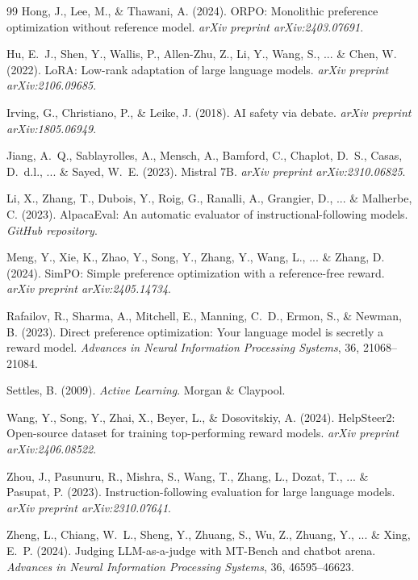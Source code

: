 \documentclass{article}
\begin{document}
\begin{thebibliography}{99}
Hong, J., Lee, M., \& Thawani, A. (2024).
ORPO: Monolithic preference optimization without reference model.
\textit{arXiv preprint arXiv:2403.07691}.

Hu, E.~J., Shen, Y., Wallis, P., Allen-Zhu, Z., Li, Y., Wang, S., ... \& Chen, W. (2022).
LoRA: Low-rank adaptation of large language models.
\textit{arXiv preprint arXiv:2106.09685}.

Irving, G., Christiano, P., \& Leike, J. (2018).
AI safety via debate.
\textit{arXiv preprint arXiv:1805.06949}.

Jiang, A.~Q., Sablayrolles, A., Mensch, A., Bamford, C., Chaplot, D.~S., Casas, D.~d.l., ... \& Sayed, W.~E. (2023).
Mistral 7B.
\textit{arXiv preprint arXiv:2310.06825}.

Li, X., Zhang, T., Dubois, Y., Roig, G., Ranalli, A., Grangier, D., ... \& Malherbe, C. (2023).
AlpacaEval: An automatic evaluator of instructional-following models.
\textit{GitHub repository}.

Meng, Y., Xie, K., Zhao, Y., Song, Y., Zhang, Y., Wang, L., ... \& Zhang, D. (2024).
SimPO: Simple preference optimization with a reference-free reward.
\textit{arXiv preprint arXiv:2405.14734}.

Rafailov, R., Sharma, A., Mitchell, E., Manning, C.~D., Ermon, S., \& Newman, B. (2023).
Direct preference optimization: Your language model is secretly a reward model.
\textit{Advances in Neural Information Processing Systems}, 36, 21068--21084.

Settles, B. (2009).
\textit{Active Learning}.
Morgan \& Claypool.

Wang, Y., Song, Y., Zhai, X., Beyer, L., \& Dosovitskiy, A. (2024).
HelpSteer2: Open-source dataset for training top-performing reward models.
\textit{arXiv preprint arXiv:2406.08522}.

Zhou, J., Pasunuru, R., Mishra, S., Wang, T., Zhang, L., Dozat, T., ... \& Pasupat, P. (2023).
Instruction-following evaluation for large language models.
\textit{arXiv preprint arXiv:2310.07641}.

Zheng, L., Chiang, W.~L., Sheng, Y., Zhuang, S., Wu, Z., Zhuang, Y., ... \& Xing, E.~P. (2024).
Judging LLM-as-a-judge with MT-Bench and chatbot arena.
\textit{Advances in Neural Information Processing Systems}, 36, 46595--46623.

\end{thebibliography}
\end{document}
